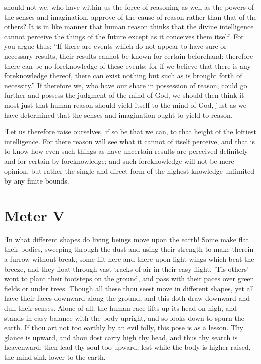 should not we, who have within us the force of reasoning as well as
the powers of the senses and imagination, approve of the cause of
reason rather than that of the others? It is in like manner that human
reason thinks that  the divine intelligence cannot perceive
the things of the future except as it conceives them itself. For you
argue thus: ``If there are events which do not appear to have sure or
necessary results, their results cannot be known for certain
beforehand: therefore there can be no foreknowledge of these events;
for if we believe that there is any foreknowledge thereof, there can
exist nothing but such as is brought forth of necessity.'' If
therefore we, who have our share in possession of reason, could go
further and possess the judgment of the mind of God, we should then
think it most just that human reason should yield itself to the mind
of God, just as we have determined that the senses and imagination
ought to yield to reason.

`Let us therefore raise ourselves, if so be that we can, to that
height of the loftiest intelligence. For there reason will see what it
cannot of itself perceive, and that is to know how even such things as
have uncertain results are perceived definitely and for certain by
foreknowledge; and such foreknowledge will not be mere opinion, but
rather the single and direct form of the highest knowledge unlimited
by any finite bounds.

\section*{Meter V}

`In what different shapes do living beings move upon the earth! Some
make flat their bodies, sweeping through the dust and using their
strength to make therein a furrow without break; some flit here and
there upon light wings  which beat the breeze, and they
float through vast tracks of air in their easy flight. 'Tis others'
wont to plant their footsteps on the ground, and pass with their paces
over green fields or under trees. Though all these thou seest move in
different shapes, yet all have their faces downward along the ground,
and this doth draw downward and dull their senses. Alone of all, the
human race lifts up its head on high, and stands in easy balance with
the body upright, and so looks down to spurn the earth. If thou art
not too earthly by an evil folly, this pose is as a lesson. Thy glance
is upward, and thou dost carry high thy head, and thus thy search is
heavenward: then lead thy soul too upward, lest while the body is
higher raised, the mind sink lower to the earth.

